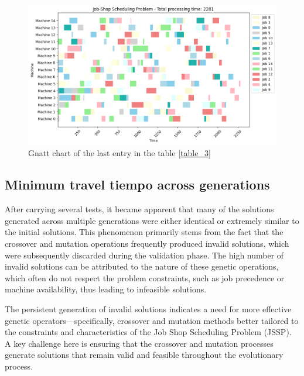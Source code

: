 \documentclass[11pt, a4paper]{article}
\begin{document}
\begin{figure}[H]
    \centering
    \includegraphics[width=\textwidth]{media/results_la36.png}
    \caption{Gnatt chart of the last entry in the table \ref{table_3}}
    \label{fig:image_15}
\end{figure}


\subsection{Minimum travel tiempo across generations}

After carrying several tests, it became apparent that many of the solutions generated across multiple generations were either identical or extremely similar to the initial solutions. 
This phenomenon primarily stems from the fact that the crossover and mutation operations frequently produced invalid solutions, which were subsequently discarded during the validation 
phase. The high number of invalid solutions can be attributed to the nature of these genetic operations, which often do not respect the problem constraints, such as job precedence or 
machine availability, thus leading to infeasible solutions.

\vspace{1em} The persistent generation of invalid solutions indicates a need for more effective genetic operators—specifically, crossover and mutation methods better tailored to the 
constraints and characteristics of the Job Shop Scheduling Problem (JSSP). A key challenge here is ensuring that the crossover and mutation processes generate solutions that remain 
valid and feasible throughout the evolutionary process.
\end{document}
